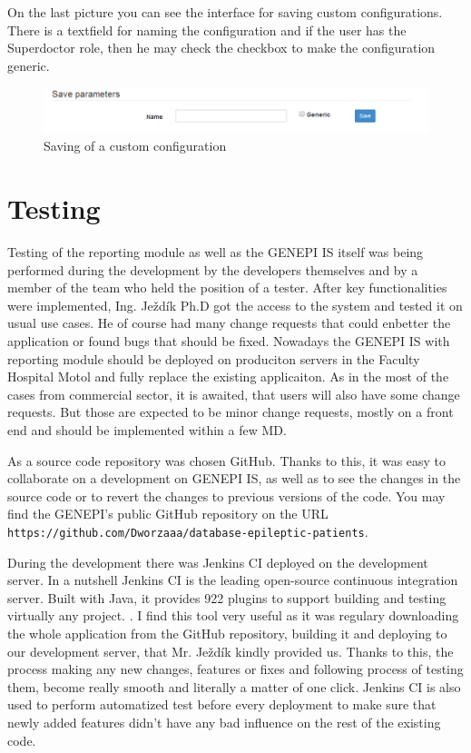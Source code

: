 \documentclass[thesis=B,english]{FITthesis}[2012/10/20]
\begin{document}
On the last picture you can see the interface for saving custom configurations. There is a textfield for naming the configuration and if the user has the Superdoctor role, then he may check the checkbox to make the configuration generic.


\begin{figure}[ht]\centering
\includegraphics[width=0.5\paperwidth]{save}
		\caption{Saving of a custom configuration}
\end{figure}

\chapter{Testing}

Testing of the reporting module as well as the GENEPI IS itself was being performed during the development by the developers themselves and by a member of the team who held the position of a tester. After key  functionalities were implemented, Ing. Ježdík Ph.D got the access to the system and tested it on usual use cases. He of course had many change requests that could enbetter the application or found bugs that should be fixed. Nowadays the GENEPI IS with reporting module should be deployed on produciton servers in the Faculty Hospital Motol and fully replace the existing applicaiton. As in the most of the cases from commercial sector, it is awaited, that users will also have some change requests. But those are expected to be minor change requests, mostly on a front end and should be implemented within a few MD.

As a source code repository was chosen GitHub. Thanks to this, it was easy to collaborate on a development on GENEPI IS, as well as to see the changes in the source code or to revert the changes to previous versions of the code. You may find the GENEPI's public GitHub repository on the URL \verb| https://github.com/Dworzaaa/database-epileptic-patients|.

During the development there was Jenkins CI deployed on the development server. In a nutshell Jenkins CI is the leading open-source continuous integration server. Built with Java, it provides 922 plugins to support building and testing virtually any project. \cite{http://jenkins-ci.org/content/about-jenkins-ci}. I find this tool very useful as it was regulary downloading the whole application from the GitHub repository, building it and deploying to our development server, that Mr. Ježdík kindly provided us. Thanks to this, the process making any new changes, features or fixes and following process of testing them, become really smooth and literally a matter of one click. Jenkins CI is also used to perform automatized test before every deployment to make sure that newly added features didn't have any bad influence on the rest of the existing code.
\end{document}
